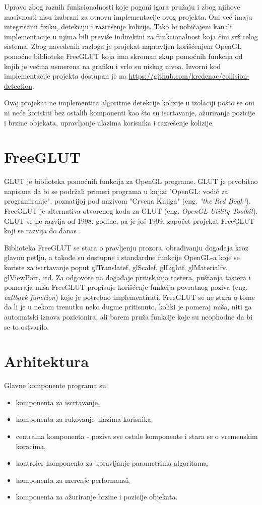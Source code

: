 \documentclass[12pt,oneside]{memoir}
\begin{document}
Upravo zbog raznih funkcionalnosti koje pogoni igara pružaju i zbog njihove masivnosti nisu izabrani
za osnovu implementacije ovog projekta. Oni već imaju integrisanu fiziku, detekciju 
i razrešenje kolizije. Tako bi uobičajeni kanali implementacije u njima 
bili previše indirektni za funkcionalnost koja čini srž celog sistema.
Zbog navedenih razloga je projekat  napravljen korišćenjem OpenGL pomoćne 
biblioteke FreeGLUT  koja ima skroman skup pomoćnih
funkcija od kojih je većina usmerena na grafiku i vrlo su niskog nivoa.
Izvorni kod implementacije projekta dostupan je na \url{https://github.com/kredenac/collision-detection}.

Ovaj projekat ne implementira algoritme detekcije kolizije u izolaciji pošto 
se oni ni neće koristiti bez ostalih komponenti kao što su iscrtavanje, ažuriranje pozicije i brzine objekata,
upravljanje ulazima korisnika i razrešenje kolizije.

\section{FreeGLUT}

GLUT je biblioteka pomoćnih funkcija za OpenGL programe.
GLUT je prvobitno napisana da bi se podržali primeri programa u knjizi "OpenGL:
vodič za programiranje", poznatijoj pod nazivom "Crvena Knjiga" (eng. {\em "the Red Book"}).
FreeGLUT je alternativa otvorenog koda za GLUT (eng. {\em OpenGL Utility Toolkit}). 
GLUT se ne razvija od 1998. godine, pa je još 1999. započet projekat FreeGLUT  koji 
se razvija do danas \cite{freeglut}. 

Biblioteka FreeGLUT se stara o pravljenju prozora, obrađivanju događaja kroz glavnu petlju,
a takođe su dostupne i standardne funkcije OpenGL-a koje se koriste
za iscrtavanje poput glTranslatef, glScalef, glLightf, glMaterialfv, glViewPort, itd.
Za odgovore na događaje pritiskanja tastera, puštanja tastera i pomeraja miša
FreeGLUT propisuje korišćenje funkcija povratnog poziva  (eng. {\em callback function}) koje je potrebno implementirati.
FreeGLUT se ne stara o tome da li je u nekom trenutku neko dugme pritisnuto, 
koliki je pomeraj miša, niti ga automatski iznova pozicionira, ali barem pruža 
funkcije koje su neophodne da bi se to ostvarilo.

\section{Arhitektura}

Glavne komponente programa su:
\begin{itemize}
	\item komponenta za iscrtavanje,
	\item komponenta za rukovanje ulazima korisnika,
	\item centralna komponenta - poziva sve ostale komponente i stara se o vremenskim koracima,
	\item kontroler komponenta za upravljanje parametrima algoritama,
	\item komponenta za merenje performansi,
	\item komponenta za ažuriranje brzine i pozicije objekata.
\end{itemize}
\end{document}
